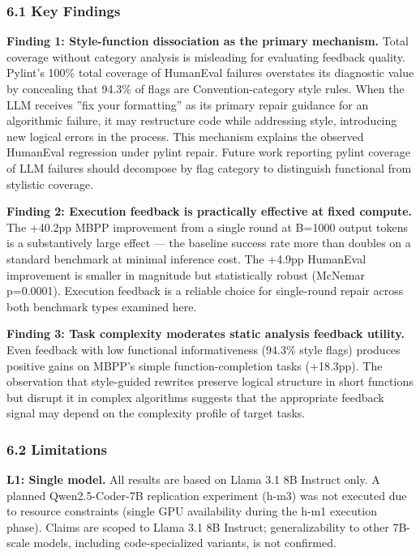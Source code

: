 
\subsubsection{6.1 Key Findings}

\textbf{Finding 1: Style-function dissociation as the primary mechanism.} Total coverage without category analysis is misleading for evaluating feedback quality. Pylint's 100\% total coverage of HumanEval failures overstates its diagnostic value by concealing that 94.3\% of flags are Convention-category style rules. When the LLM receives ''fix your formatting'' as its primary repair guidance for an algorithmic failure, it may restructure code while addressing style, introducing new logical errors in the process. This mechanism explains the observed HumanEval regression under pylint repair. Future work reporting pylint coverage of LLM failures should decompose by flag category to distinguish functional from stylistic coverage.

\textbf{Finding 2: Execution feedback is practically effective at fixed compute.} The +40.2pp MBPP improvement from a single round at B=1000 output tokens is a substantively large effect --- the baseline success rate more than doubles on a standard benchmark at minimal inference cost. The +4.9pp HumanEval improvement is smaller in magnitude but statistically robust (McNemar p=0.0001). Execution feedback is a reliable choice for single-round repair across both benchmark types examined here.

\textbf{Finding 3: Task complexity moderates static analysis feedback utility.} Even feedback with low functional informativeness (94.3\% style flags) produces positive gains on MBPP's simple function-completion tasks (+18.3pp). The observation that style-guided rewrites preserve logical structure in short functions but disrupt it in complex algorithms suggests that the appropriate feedback signal may depend on the complexity profile of target tasks.

\subsubsection{6.2 Limitations}

\textbf{L1: Single model.} All results are based on Llama 3.1 8B Instruct only. A planned Qwen2.5-Coder-7B replication experiment (h-m3) was not executed due to resource constraints (single GPU availability during the h-m1 execution phase). Claims are scoped to Llama 3.1 8B Instruct; generalizability to other 7B-scale models, including code-specialized variants, is not confirmed.

